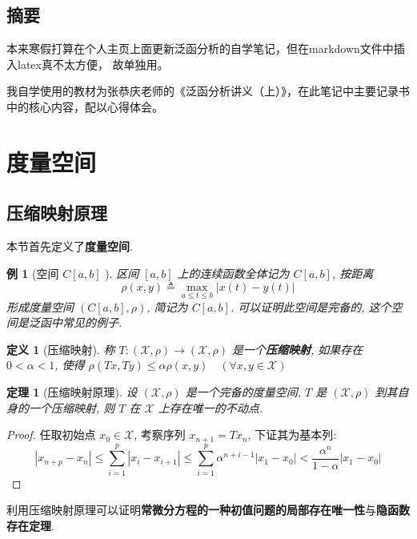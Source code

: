 \documentclass[12pt,a4paper]{article}
\newtheorem{thm}{定理}[subsection]  %
\newtheorem{definition}{定义}[subsection] %
\newtheorem{example}{例}[subsection] %
\begin{document}
\begin{center}
\section*{摘要}
\end{center}

本来寒假打算在个人主页上面更新泛函分析的自学笔记，但在markdown文件中插入latex真不太方便，
故单独用。

我自学使用的教材为张恭庆老师的《泛函分析讲义（上）》，在此笔记中主要记录书中的核心内容，配以心得体会。


{\centering\tableofcontents}

\newpage
\section{度量空间}
\subsection{压缩映射原理}
本节首先定义了\textbf{度量空间}.

\begin{example}[{空间 $C[a,b]$ }]
    区间 $[a,b]$ 上的连续函数全体记为 $C[a,b]$, 按距离 \[\rho(x,y) \triangleq \underset{a \leq t \leq b}{\max} | x(t) - y(t) | \]
    形成度量空间 $(C[a,b], \rho)$, 简记为 $C[a,b]$. 可以证明此空间是完备的, 这个空间是泛函中常见的例子.
\end{example}

\begin{definition}[压缩映射]
    称 $T: (\mathscr{X}, \rho) \to (\mathscr{X}, \rho)$ 是一个\textbf{压缩映射}, 如果存在 $0<\alpha<1$, 使得 $\rho(Tx,Ty) \leq \alpha \rho(x,y) \quad (\forall x,y \in \mathscr{X})$
\end{definition}

\begin{thm}[压缩映射原理]
    设 $(\mathscr{X}, \rho)$ 是一个完备的度量空间, $T$ 是 $(\mathscr{X}, \rho)$ 到其自身的一个压缩映射, 则 $T$ 在 $\mathscr{X}$ 上存在唯一的不动点.
\end{thm}
\begin{proof}
    任取初始点 $x_0 \in \mathscr{X}$, 考察序列 $x_{n+1} = Tx_{n}$, 下证其为基本列:
    \[|x_{n+p} - x_{n} | \leq \sum\limits_{i = 1}^p | x_i - x_{i+1}| \leq \sum\limits_{i=1}^p\alpha^{n+i-1} |x_1 - x_0| < \frac{\alpha^n}{1-\alpha} |x_1-x_0|\]
\end{proof}

利用压缩映射原理可以证明\textbf{常微分方程的一种初值问题的局部存在唯一性}与\textbf{隐函数存在定理}.
\end{document}
